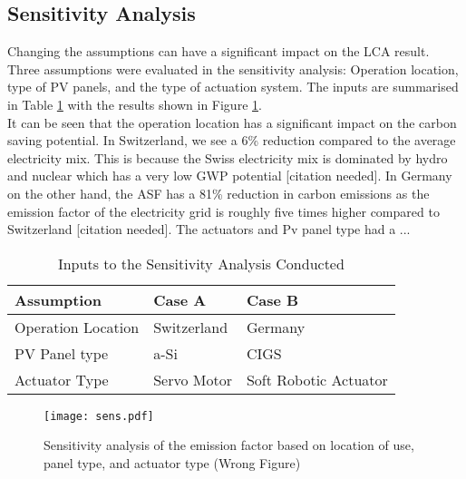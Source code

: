\subsection{Sensitivity Analysis}

Changing the assumptions can have a significant impact on the LCA result. Three assumptions were evaluated in the sensitivity analysis: Operation location, type of PV panels, and the type of actuation system. The inputs are summarised in Table \ref{tab:sens} with the results shown in Figure \ref{fig:sens}. \\

It can be seen that the operation location has a significant impact on the carbon saving potential. In Switzerland, we see a 6\% reduction compared to the average electricity mix. This is because the Swiss electricity mix is dominated by hydro and nuclear which has a very low GWP potential [citation needed]. In Germany on the other hand, the ASF has a 81\% reduction in carbon emissions as the emission factor of the electricity grid is roughly five times higher compared to Switzerland [citation needed]. The actuators and Pv panel type had a ...



\begin{table}
\centering
\begin{tabular}{lll}
Assumption & Case A & Case B \\
\hline
Operation Location  & Switzerland & Germany \\
PV Panel type  & a-Si        & CIGS    \\
Actuator Type           & Servo Motor       & Soft Robotic Actuator   \\
\end{tabular}
\caption{Inputs to the Sensitivity Analysis Conducted}
\label{tab:sens}
\end{table}

\begin{figure}[H]
\begin{center}
\texttt{[image: sens.pdf]}
\caption{Sensitivity analysis of the emission factor based on location of use, panel type, and actuator type (Wrong Figure)}
\label{fig:sens}
\end{center}
\end{figure}






